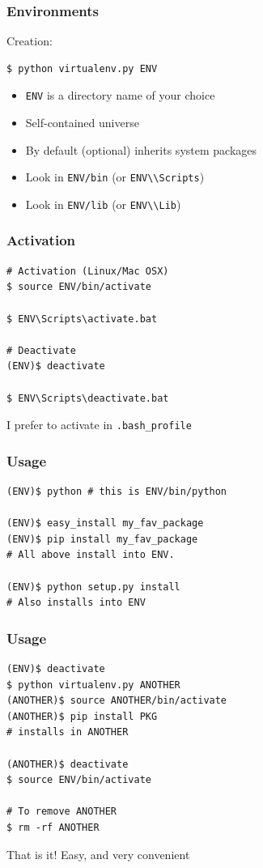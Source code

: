 \documentclass[14pt,compress]{beamer}
\newcommand{\typ}[1]{\lstinline{#1}}
\begin{document}
\begin{frame}[fragile]
  \frametitle{Environments}
Creation:

  \begin{lstlisting}
$ python virtualenv.py ENV
  \end{lstlisting}

  \begin{itemize}
      \item \typ{ENV} is a directory name of your choice
      \item Self-contained universe
      \item By default (optional) inherits system packages
      \item Look in \typ{ENV/bin} (or \typ{ENV\\Scripts})

      \item Look in \typ{ENV/lib} (or \typ{ENV\\Lib})
  \end{itemize}

\end{frame}

\begin{frame}[fragile]
  \frametitle{Activation}

  \begin{lstlisting}
# Activation (Linux/Mac OSX)
$ source ENV/bin/activate

$ ENV\Scripts\activate.bat

# Deactivate
(ENV)$ deactivate

$ ENV\Scripts\deactivate.bat
  \end{lstlisting}
  \vspace*{0.1in}
  I prefer to activate in \typ{.bash_profile}
\end{frame}

\begin{frame}[fragile]
  \frametitle{Usage}
  \begin{lstlisting}
(ENV)$ python # this is ENV/bin/python

(ENV)$ easy_install my_fav_package
(ENV)$ pip install my_fav_package
# All above install into ENV.

(ENV)$ python setup.py install
# Also installs into ENV

  \end{lstlisting}

\end{frame}

\begin{frame}[fragile]
  \frametitle{Usage}
  \begin{lstlisting}
(ENV)$ deactivate
$ python virtualenv.py ANOTHER
(ANOTHER)$ source ANOTHER/bin/activate
(ANOTHER)$ pip install PKG
# installs in ANOTHER

(ANOTHER)$ deactivate
$ source ENV/bin/activate

# To remove ANOTHER
$ rm -rf ANOTHER
\end{lstlisting}

That is it! Easy, and very convenient
\end{frame}
\end{document}
